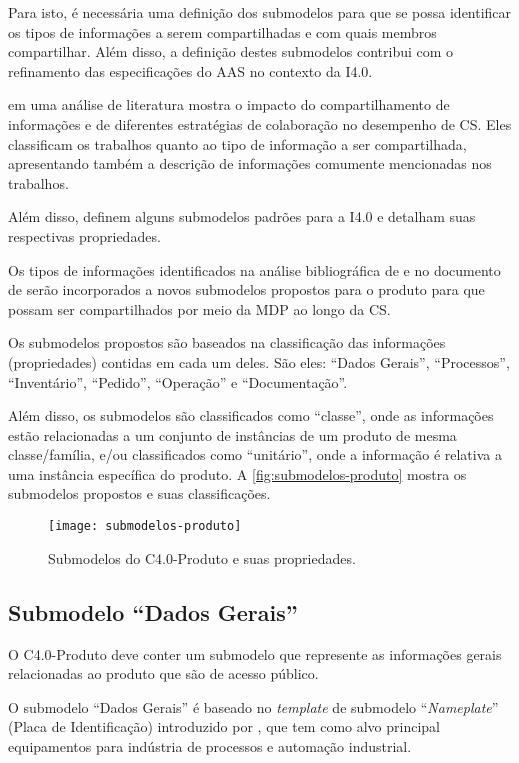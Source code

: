 Para isto, é necessária uma definição dos submodelos para que se possa identificar os tipos de informações a serem compartilhadas e com quais membros compartilhar. Além disso, a definição destes submodelos contribui com o refinamento das especificações do AAS no contexto da I4.0.

 em uma análise de literatura mostra o impacto do compartilhamento de informações e de diferentes estratégias de colaboração no desempenho de CS. Eles classificam os trabalhos quanto ao tipo de informação a ser compartilhada, apresentando também a descrição de informações comumente mencionadas nos trabalhos.

Além disso,  definem alguns submodelos padrões para a I4.0 e detalham suas respectivas propriedades.

Os tipos de informações identificados na análise bibliográfica de  e no documento de  serão incorporados a novos submodelos propostos para o produto para que possam ser compartilhados por meio da MDP ao longo da CS.

Os submodelos propostos são baseados na classificação das informações (propriedades) contidas em cada um deles. São eles: ``Dados Gerais'', ``Processos'', ``Inventário'', ``Pedido'', ``Operação'' e ``Documentação''.

Além disso, os submodelos são classificados como ``classe'', onde as informações estão relacionadas a um conjunto de instâncias de um produto de mesma classe/família, e/ou classificados como ``unitário'', onde a informação é relativa a uma instância específica do produto. A \autoref{fig:submodelos-produto} mostra os submodelos propostos e suas classificações.

\begin{figure}[htb]
	\centering
	\texttt{[image: submodelos-produto]}
	\caption{Submodelos do C4.0-Produto e suas propriedades.}
	\label{fig:submodelos-produto}
\end{figure}

\subsection{Submodelo ``Dados Gerais''}

O C4.0-Produto deve conter um submodelo que represente as informações gerais relacionadas ao produto que são de acesso público.

O submodelo ``Dados Gerais'' é baseado no \textit{template} de submodelo ``\textit{Nameplate}'' (Placa de Identificação) introduzido por , que tem como alvo principal equipamentos para indústria de processos e automação industrial.


